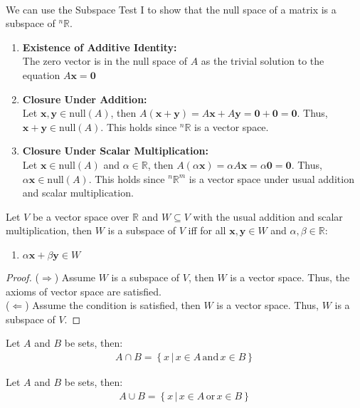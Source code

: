 \documentclass[11pt]{article}
\begin{document}
    \paragraph{} We can use the Subspace Test I to show that the null space of a matrix is a subspace of $^n\mathbb{R}$.
        \begin{enumerate}
            \item \textbf{Existence of Additive Identity:} \\
            The zero vector is in the null space of $A$ as the trivial solution to the equation $A\textbf{x} = \textbf{0}$
            \item \textbf{Closure Under Addition:} \\
            Let $\textbf{x}, \textbf{y} \in \text{null}(A)$, then $A(\textbf{x} + \textbf{y}) = A\textbf{x} + A\textbf{y} = \textbf{0} + \textbf{0} = \textbf{0}$. Thus, $\textbf{x} + \textbf{y} \in \text{null}(A)$. This holds since $^n\mathbb{R}$ is a vector space.
            \item \textbf{Closure Under Scalar Multiplication:} \\
            Let $\textbf{x} \in \text{null}(A)$ and $\alpha \in \mathbb{R}$, then $A(\alpha \textbf{x}) = \alpha A\textbf{x} = \alpha \textbf{0} = \textbf{0}$. Thus, $\alpha \textbf{x} \in \text{null}(A)$. This holds since $^n\mathbb{R}^m$ is a vector space under usual addition and scalar multiplication.
        \end{enumerate}
\begin{theorem}
    Let $V$ be a vector space over $\mathbb{R}$ and $W \subseteq V$ with the usual addition and scalar multiplication, then $W$ is a subspace of $V$ iff for all $\textbf{x}, \textbf{y} \in W$ and $\alpha, \beta \in \mathbb{R}$:
    \begin{enumerate}
        \item $\alpha \textbf{x} + \beta \textbf{y} \in W$
    \end{enumerate}
\end{theorem}
\begin{proof}
    ($\Rightarrow$) Assume $W$ is a subspace of $V$, then $W$ is a vector space. Thus, the axioms of vector space are satisfied. \\
    ($\Leftarrow$) Assume the condition is satisfied, then $W$ is a vector space. Thus, $W$ is a subspace of $V$.
\end{proof}
\begin{definition}
    Let $A$ and $B$ be sets, then:
    \begin{align}
        A \cap B = \left\{ x \, | \, x \in A \, \text{and} \, x \in B \right\}
    \end{align}
\end{definition}
\begin{definition}
    Let $A$ and $B$ be sets, then:
    \begin{align}
        A \cup B = \left\{ x \, | \, x \in A \, \text{or} \, x \in B \right\}
    \end{align}
\end{definition}
\end{document}
